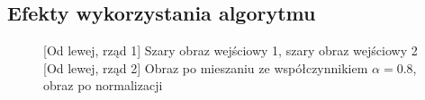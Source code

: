 \documentclass[a4paper,12pt, titlepage]{report}
\begin{document}
\subsection*{Efekty wykorzystania algorytmu}
\begin{figure}[h]
    \centering
    \qquad
    \caption{[Od lewej, rząd 1] Szary obraz wejściowy 1, szary obraz wejściowy 2 [Od lewej, rząd 2] Obraz po mieszaniu ze współczynnikiem \(\alpha=0.8\), obraz po normalizacji}%
    \label{fig:rysunek}%
\end{figure}
\end{document}
